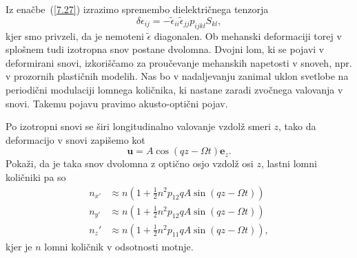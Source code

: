 Iz enačbe~(\ref{7.27}) izrazimo
spremembo dielektričnega tenzorja 
\begin{equation}
\delta\epsilon_{ij}=-\tilde{\epsilon}_{ii}\tilde{\epsilon}_{jj}p_{ijkl}S_{kl},
\label{7.29}
\end{equation}
kjer smo privzeli, da je nemoteni $\tilde{\epsilon}$ diagonalen. Ob mehanski deformaciji
torej v splošnem tudi izotropna snov postane dvolomna.
Dvojni lom, ki se pojavi v deformirani snovi, izkoriščamo za proučevanje
mehanskih napetosti v snoveh, npr. v prozornih plastičnih modelih. 
Nas bo v nadaljevanju zanimal uklon  svetlobe na periodični
modulaciji lomnega količnika, ki nastane zaradi zvočnega valovanja v snovi. Takemu pojavu
pravimo akusto-optični pojav.

\begin{definition}
\label{nalogaAO}
Po izotropni snovi se širi longitudinalno valovanje vzdolž smeri $z$, tako da 
deformacijo v snovi zapišemo kot
\begin{equation}
\mathbf{u} = A \cos(q z - \Omega t)\mathbf{e}_z.
\end{equation}
Pokaži, da je taka snov dvolomna z optično osjo vzdolž osi $z$, lastni 
lomni količniki pa so 
\begin{align}
n_{x'} &\approx n(1+\frac{1}{2}n^2p_{12}q A \sin (q z - \Omega t))\\
n_{y'} &\approx n(1+\frac{1}{2}n^2p_{12}q A \sin (q z - \Omega t))\\
n_z' &\approx n(1+\frac{1}{2}n^2p_{11}q A \sin (q z - \Omega t)),
\end{align}
kjer je $n$ lomni količnik v odsotnosti motnje.
\end{definition}

